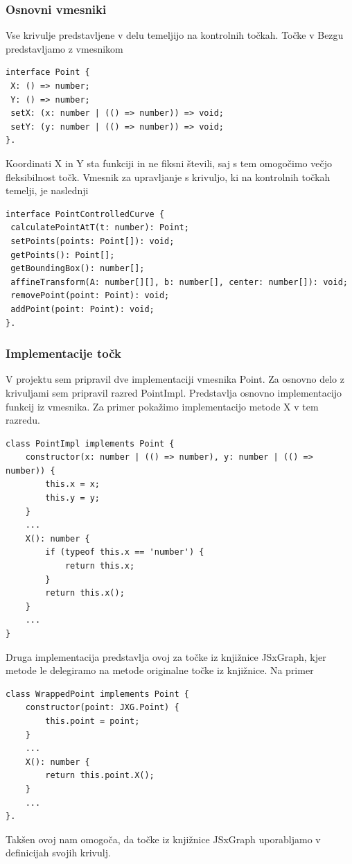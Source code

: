 \documentclass[isrm2, tisk]{fmfdelo}
\begin{document}
    \subsubsection{Osnovni vmesniki}\label{subsubsec:osnovni-vmesniki}
    Vse krivulje predstavljene v delu temeljijo na kontrolnih točkah.
    Točke v Bezgu predstavljamo z vmesnikom
    \begin{lstlisting}[label={lst:vmesnik-tocke}]
interface Point {
 X: () => number;
 Y: () => number;
 setX: (x: number | (() => number)) => void;
 setY: (y: number | (() => number)) => void;
}.
    \end{lstlisting}
    Koordinati X in Y sta funkciji in ne fiksni števili, saj s tem omogočimo večjo fleksibilnost točk.
    Vmesnik za upravljanje s krivuljo, ki na kontrolnih točkah temelji, je naslednji
    \begin{lstlisting}[label={lst:vmesnik-curve}]
interface PointControlledCurve {
 calculatePointAtT(t: number): Point;
 setPoints(points: Point[]): void;
 getPoints(): Point[];
 getBoundingBox(): number[];
 affineTransform(A: number[][], b: number[], center: number[]): void;
 removePoint(point: Point): void;
 addPoint(point: Point): void;
}.
    \end{lstlisting}

    \subsubsection{Implementacije točk}
    V projektu sem pripravil dve implementaciji vmesnika Point.
    Za osnovno delo z krivuljami sem pripravil razred PointImpl.
    Predstavlja osnovno implementacijo funkcij iz vmesnika.
    Za primer pokažimo implementacijo metode X v tem razredu.
    \begin{lstlisting}[label={lst:point-impl}]
class PointImpl implements Point {
    constructor(x: number | (() => number), y: number | (() => number)) {
        this.x = x;
        this.y = y;
    }
    ...
    X(): number {
        if (typeof this.x == 'number') {
            return this.x;
        }
        return this.x();
    }
    ...
}
    \end{lstlisting}
    Druga implementacija predstavlja ovoj za točke iz knjižnice JSxGraph, kjer metode le delegiramo na metode originalne točke iz knjižnice.
    Na primer
    \begin{lstlisting}[label={lst:jsx-point-impl}]
class WrappedPoint implements Point {
    constructor(point: JXG.Point) {
        this.point = point;
    }
    ...
    X(): number {
        return this.point.X();
    }
    ...
}.
    \end{lstlisting}
    Takšen ovoj nam omogoča, da točke iz knjižnice JSxGraph uporabljamo v definicijah svojih krivulj.
\end{document}
